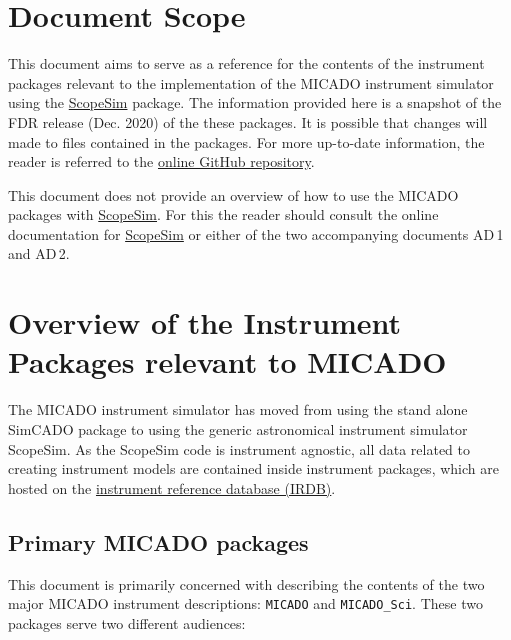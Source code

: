 

\section{Document Scope%
  \label{document-scope}%
}

This document aims to serve as a reference for the contents of the instrument packages relevant to the implementation of the MICADO instrument simulator using the \href{https://scopesim.readthedocs.io/en/latest/}{ScopeSim} package.
The information provided here is a snapshot of the FDR release (Dec. 2020) of the these packages.
It is possible that changes will made to files contained in the packages.
For more up-to-date information, the reader is referred to the \href{https://github.com/astronomyk/irdb}{online GitHub repository}.

This document does not provide an overview of how to use the MICADO packages with \href{https://scopesim.readthedocs.io/en/latest/}{ScopeSim}.
For this the reader should consult the online documentation for \href{https://scopesim.readthedocs.io/en/latest/}{ScopeSim} or either of the two accompanying documents AD\,1 and AD\,2.


\section{Overview of the Instrument Packages relevant to MICADO%
  \label{overview-of-the-instrument-packages-relevant-to-micado}%
}

The MICADO instrument simulator has moved from using the stand alone SimCADO package to using the generic astronomical instrument simulator ScopeSim.
As the ScopeSim code is instrument agnostic, all data related to creating instrument models are contained inside instrument packages, which are hosted on the \href{https://github.com/astronomyk/irdb}{instrument reference database (IRDB)}.


\subsection{Primary MICADO packages%
  \label{primary-micado-packages}%
}

This document is primarily concerned with describing the contents of the two major MICADO instrument descriptions: \texttt{MICADO} and \texttt{MICADO\_Sci}.
These two packages serve two different audiences:

